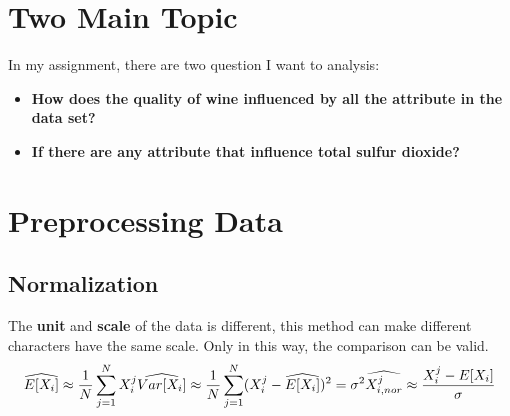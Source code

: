 \documentclass[titlepage,a4paper,12pt,thmsb]{report}
\begin{document}







\chapter*{Two Main Topic}

In my assignment, there are two question I want to analysis:
\newline{}
\begin{itemize}
\item{\bf How does the quality of wine influenced by all the attribute in the data set?}
\item{\bf If there are any attribute that influence total sulfur dioxide?}
\end{itemize}


\chapter*{Preprocessing Data}


\section*{Normalization}
The {\bf unit} and {\bf scale} of the data is different, this method can make different characters have the same scale.  Only in this way, the comparison can be valid.
$$
  \widehat{E[X_i]} \approx \frac{1}{N} \sum_{j=1}^{N} X_i^j \\
  \widehat{Var[X_i]}   \approx \frac{1}{N} \sum_{j=1}^N (X_i^j - \widehat{E[X_i]})^2 = \sigma^2 \\
  \widehat{X_{i,nor}^j}  \approx \frac{X_i^j - E[X_i]}{\sigma}
$$
\end{document}
